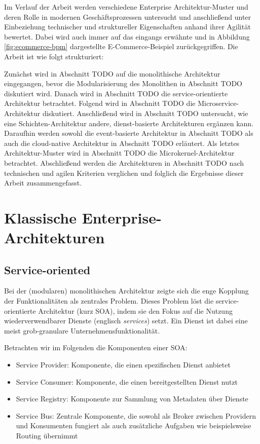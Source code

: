 \documentclass[acmtog]{acmart}
\begin{document}
Im Verlauf der Arbeit werden verschiedene Enterprise Architektur-Muster und deren Rolle in modernen Geschäftsprozessen untersucht
und anschließend unter Einbeziehung technischer und struktureller Eigenschaften anhand ihrer Agilität bewertet.
Dabei wird auch immer auf das eingangs erwähnte und in Abbildung \ref{fig:ecommerce-bpm} dargestellte E-Commerce-Beispiel zurückgegriffen.
Die Arbeit ist wie folgt strukturiert:

Zunächst wird in Abschnitt TODO auf die monolithische Architektur eingegangen, bevor die Modularisierung des Monolithen in Abschnitt TODO diskutiert wird.
Danach wird in Abschnitt TODO die service-orientierte Architektur betrachtet.
Folgend wird in Abschnitt TODO die Microservice-Architektur diskutiert.
Anschließend wird in Abschnitt TODO untersucht, wie eine Schichten-Architektur andere, dienst-basierte Architekturen ergänzen kann.
Daraufhin werden sowohl die event-basierte Architektur in Abschnitt TODO als auch die cloud-native Architektur in Abschnitt TODO erläutert.
Als letztes Architektur-Muster wird in Abschnitt TODO die Microkernel-Architektur betrachtet.
Abschließend werden die Architekturen in Abschnitt TODO nach technischen und agilen Kriterien verglichen und folglich die Ergebnisse dieser Arbeit zusammengefasst.

\section{Klassische Enterprise-Architekturen}

\subsection{Service-oriented}
Bei der (modularen) monolithischen Architektur zeigte sich die enge Kopplung der Funktionalitäten als zentrales Problem.
Dieses Problem löst die service-orientierte Architektur (kurz SOA), indem sie den Fokus auf die Nutzung wiederverwendbarer Dienste (englisch \textit{services}) setzt.
Ein Dienst ist dabei eine meist grob-granulare Unternehmensfunktionalität.

Betrachten wir im Folgenden die Komponenten einer SOA:
\begin{itemize}
  \item Service Provider: Komponente, die einen spezifischen Dienst anbietet \cite{soa4}
  \item Service Consumer: Komponente, die einen bereitgestellten Dienst nutzt
  \item Service Registry: Komponente zur Sammlung von Metadaten über Dienste
  \item Service Bus: Zentrale Komponente, die sowohl als Broker zwischen Providern und Konsumenten fungiert als auch zusätzliche Aufgaben wie beispielsweise Routing übernimmt
\end{itemize}
\end{document}
